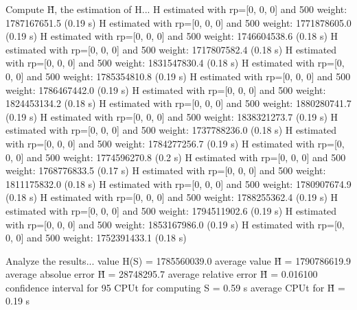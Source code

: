 Compute H̃, the estimation of H...
  H estimated with rp=[0, 0, 0] and 500 weight:  1787167651.5  (0.19 s)
  H estimated with rp=[0, 0, 0] and 500 weight:  1771878605.0  (0.19 s)
  H estimated with rp=[0, 0, 0] and 500 weight:  1746604538.6  (0.18 s)
  H estimated with rp=[0, 0, 0] and 500 weight:  1717807582.4  (0.18 s)
  H estimated with rp=[0, 0, 0] and 500 weight:  1831547830.4  (0.18 s)
  H estimated with rp=[0, 0, 0] and 500 weight:  1785354810.8  (0.19 s)
  H estimated with rp=[0, 0, 0] and 500 weight:  1786467442.0  (0.19 s)
  H estimated with rp=[0, 0, 0] and 500 weight:  1824453134.2  (0.18 s)
  H estimated with rp=[0, 0, 0] and 500 weight:  1880280741.7  (0.19 s)
  H estimated with rp=[0, 0, 0] and 500 weight:  1838321273.7  (0.19 s)
  H estimated with rp=[0, 0, 0] and 500 weight:  1737788236.0  (0.18 s)
  H estimated with rp=[0, 0, 0] and 500 weight:  1784277256.7  (0.19 s)
  H estimated with rp=[0, 0, 0] and 500 weight:  1774596270.8  (0.2 s)
  H estimated with rp=[0, 0, 0] and 500 weight:  1768776833.5  (0.17 s)
  H estimated with rp=[0, 0, 0] and 500 weight:  1811175832.0  (0.18 s)
  H estimated with rp=[0, 0, 0] and 500 weight:  1780907674.9  (0.18 s)
  H estimated with rp=[0, 0, 0] and 500 weight:  1788255362.4  (0.19 s)
  H estimated with rp=[0, 0, 0] and 500 weight:  1794511902.6  (0.19 s)
  H estimated with rp=[0, 0, 0] and 500 weight:  1853167986.0  (0.19 s)
  H estimated with rp=[0, 0, 0] and 500 weight:  1752391433.1  (0.18 s)

Analyze the results...
  value H(S)                  = 1785560039.0 
  average value H̃             = 1790786619.9 
  average absolue error H̃     = 28748295.7 
  average relative error H̃    = 0.016100 
  confidence interval for 95%
  CPUt for computing S         = 0.59 s
  average CPUt for H̃           = 0.19 s

